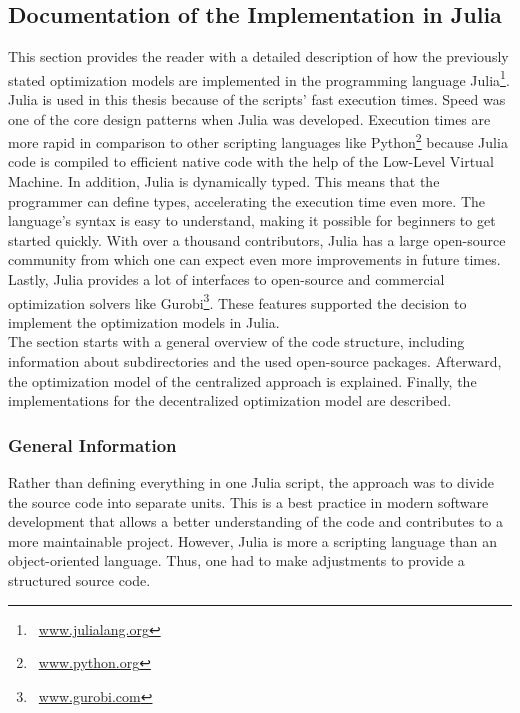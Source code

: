 \subsection{Documentation of the Implementation in Julia}
\label{sec:app:implementation}

This section provides the reader with a detailed description of how the previously stated optimization models are implemented in the programming language Julia\footnote{~\url{www.julialang.org}}. Julia is used in this thesis because of the scripts' fast execution times. Speed was one of the core design patterns when Julia was developed. Execution times are more rapid in comparison to other scripting languages like Python\footnote{~\url{www.python.org}} because Julia code is compiled to efficient native code with the help of the Low-Level Virtual Machine. In addition, Julia is dynamically typed. This means that the programmer can define types, accelerating the execution time even more. The language's syntax is easy to understand, making it possible for beginners to get started quickly. With over a thousand contributors, Julia has a large open-source community from which one can expect even more improvements in future times. Lastly, Julia provides a lot of interfaces to open-source and commercial optimization solvers like Gurobi\footnote{~\url{www.gurobi.com}}. These features supported the decision to implement the optimization models in Julia. \\

The section starts with a general overview of the code structure, including information about subdirectories and the used open-source packages. Afterward, the optimization model of the centralized approach is explained. Finally, the implementations for the decentralized optimization model are described.

\subsubsection{General Information}

Rather than defining everything in one Julia script, the approach was to divide the source code into separate units. This is a best practice in modern software development that allows a better understanding of the code and contributes to a more maintainable project. However, Julia is more a scripting language than an object-oriented language. Thus, one had to make adjustments to provide a structured source code.\\ 

